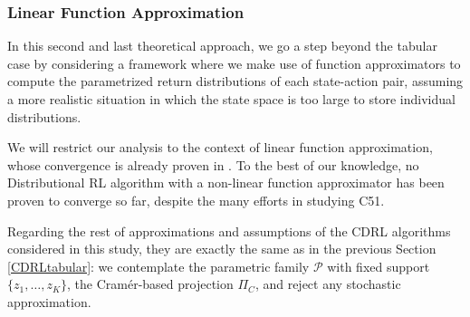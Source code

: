\documentclass[12pt,a4paper,openright,twoside]{article}
\DeclareMathOperator*{\T}{\mathcal{T}}
\numberwithin{equation}{section}
\theoremstyle{definition}
\theoremstyle{remark}
\theoremstyle{plain}
\begin{document}

\subsubsection{Linear Function Approximation} \label{CDRLlinear}

In this second and last theoretical approach, we go a step beyond the tabular case by considering a framework where we make use of function approximators to compute the parametrized return distributions of each state-action pair, assuming a more realistic situation in which the state space is too large to store individual distributions.

We will restrict our analysis to the context of linear function approximation, whose convergence is already proven in \cite{DRLlinear}. To the best of our knowledge, no Distributional RL algorithm with a non-linear function approximator has been proven to converge so far, despite the many efforts in studying C51.

Regarding the rest of approximations and assumptions of the CDRL algorithms considered in this study, they are exactly the same as in the previous Section \ref{CDRLtabular}: we contemplate the parametric family $\mathcal{P}$ with fixed support $\{z_1, \dots, z_K\}$, the Cramér-based projection $\Pi_C$, and reject any stochastic approximation.
\end{document}
